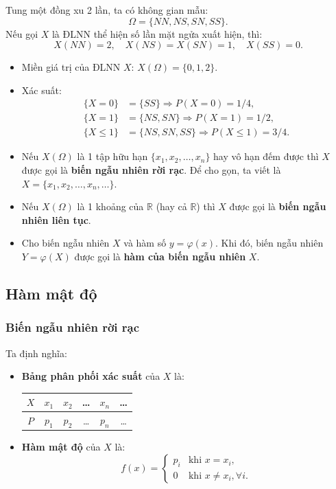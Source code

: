 \begin{vidu}
Tung một đồng xu 2 lần, ta có không gian mẫu:
\[
\Omega = \{NN, NS, SN, SS\}.
\]
Nếu gọi $X$ là ĐLNN thể hiện số lần mặt ngửa xuất hiện, thì:
\[
X(NN) = 2, \quad X(NS) = X(SN) = 1, \quad X(SS) = 0.
\]
\begin{itemize}
    \item Miền giá trị của ĐLNN $X$: $X(\Omega) = \{0, 1, 2\}$.
    \item Xác suất:
    \begin{align*}
    \{X = 0\} &= \{SS\} \Rightarrow P(X = 0) = 1/4, \\
    \{X = 1\} &= \{NS, SN\} \Rightarrow P(X = 1) = 1/2, \\
    \{X \le 1\} &= \{NS, SN, SS\} \Rightarrow P(X \le 1) = 3/4.
    \end{align*}
\end{itemize}
\end{vidu}

\begin{itemize}
    \item Nếu $X(\Omega)$ là 1 tập hữu hạn $\{x_1, x_2, \dots, x_n\}$ hay vô hạn đếm được thì $X$ được gọi là \textbf{biến ngẫu nhiên rời rạc}. Để cho gọn, ta viết là $X = \{x_1, x_2, \dots, x_n, \dots\}$.
    \item Nếu $X(\Omega)$ là 1 khoảng của $\mathbb{R}$ (hay cả $\mathbb{R}$) thì $X$ được gọi là \textbf{biến ngẫu nhiên liên tục}.
    \item Cho biến ngẫu nhiên $X$ và hàm số $y = \varphi(x)$. Khi đó, biến ngẫu nhiên $Y = \varphi(X)$ được gọi là \textbf{hàm của biến ngẫu nhiên} $X$.
\end{itemize}

\subsection{Hàm mật độ}

\subsubsection{Biến ngẫu nhiên rời rạc}
Ta định nghĩa:
\begin{itemize}
    \item \textbf{Bảng phân phối xác suất} của $X$ là:
    \begin{center}
    \begin{tabular}{|c|c|c|c|c|c|}
    \hline
    $X$ & $x_1$ & $x_2$ & \dots & $x_n$ & \dots \\
    \hline
    $P$ & $p_1$ & $p_2$ & \dots & $p_n$ & \dots \\
    \hline
    \end{tabular}
    \end{center}

    \item \textbf{Hàm mật độ} của $X$ là:
    \[
    f(x) = \begin{cases}
    p_i & \text{khi } x = x_i, \\
    0 & \text{khi } x \ne x_i, \forall i.
    \end{cases}
    \]
\end{itemize}

